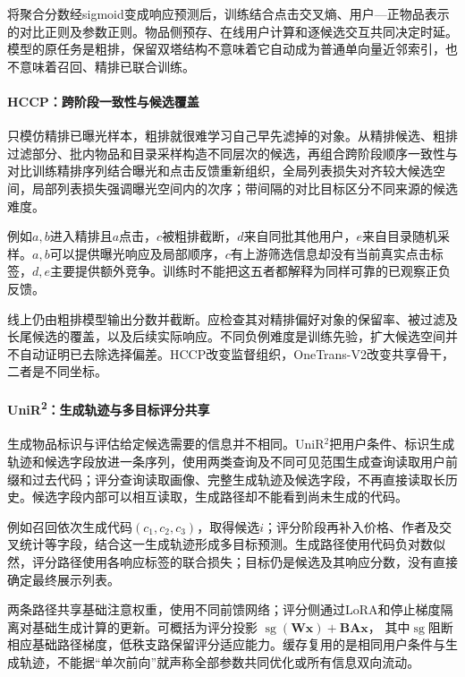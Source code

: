 将聚合分数经sigmoid变成响应预测后，训练结合点击交叉熵、用户—正物品表示的对比正则及参数正则。物品侧预存、在线用户计算和逐候选交互共同决定时延。模型的原任务是粗排，保留双塔结构不意味着它自动成为普通单向量近邻索引，也不意味着召回、精排已联合训练。

\paragraph{HCCP：跨阶段一致性与候选覆盖}
\label{sec:rs-hccp}

只模仿精排已曝光样本，粗排就很难学习自己早先滤掉的对象。从精排候选、粗排过滤部分、批内物品和目录采样构造不同层次的候选，再组合跨阶段顺序一致性与对比训练精排序列结合曝光和点击反馈重新组织，全局列表损失对齐较大候选空间，局部列表损失强调曝光空间内的次序；带间隔的对比目标区分不同来源的候选难度。

例如$a,b$进入精排且$a$点击，$c$被粗排截断，$d$来自同批其他用户，$e$来自目录随机采样。$a,b$可以提供曝光响应及局部顺序，$c$有上游筛选信息却没有当前真实点击标签，$d,e$主要提供额外竞争。训练时不能把这五者都解释为同样可靠的已观察正负反馈。

线上仍由粗排模型输出分数并截断。应检查其对精排偏好对象的保留率、被过滤及长尾候选的覆盖，以及后续实际响应。不同负例难度是训练先验，扩大候选空间并不自动证明已去除选择偏差。HCCP改变监督组织，OneTrans-V2改变共享骨干，二者是不同坐标。

\paragraph{UniR\textsuperscript{2}：生成轨迹与多目标评分共享}
\label{sec:rs-unir2}

生成物品标识与评估给定候选需要的信息并不相同。UniR$^2$把用户条件、标识生成轨迹和候选字段放进一条序列，使用两类查询及不同可见范围生成查询读取用户前缀和过去代码；评分查询读取画像、完整生成轨迹及候选字段，不再直接读取长历史。候选字段内部可以相互读取，生成路径却不能看到尚未生成的代码。

例如召回依次生成代码$(c_1,c_2,c_3)$，取得候选$i$；评分阶段再补入价格、作者及交叉统计等字段，结合这一生成轨迹形成多目标预测。生成路径使用代码负对数似然，评分路径使用各响应标签的联合损失；目标仍是候选及其响应分数，没有直接确定最终展示列表。

两条路径共享基础注意权重，使用不同前馈网络；评分侧通过LoRA和停止梯度隔离对基础生成计算的更新。可概括为评分投影
$\operatorname{sg}(\bm W\bm x)+\bm B\bm A\bm x$，
其中$\operatorname{sg}$阻断相应基础路径梯度，低秩支路保留评分适应能力。缓存复用的是相同用户条件与生成轨迹，不能据“单次前向”就声称全部参数共同优化或所有信息双向流动。


